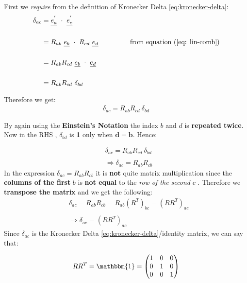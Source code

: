 First we {\em require} from the definition of Kronecker Delta \ref{eq:kronecker-delta}:
$$\begin{aligned}\delta_{ac} & = \underline{e_{a}^{'}} \ \cdot \ \underline{e_{c}^{'}}                                                                               \\ \\
                           & = R_{ab} \ \underline{e_{b}}\ \cdot \ R_{cd} \ \underline{e_{d}}\ \ \ \ \ \ \ \ \ \ \ \ \ \ \text{from equation (\ref{eq: lin-comb})} \\ \\
                           & = R_{ab}R_{cd}\ \underline{e_{b}}\ \cdot \ \underline{e_{d}}                                                                          \\ \\
                           & = R_{ab}R_{cd}\  \delta_{bd}
	\end{aligned}$$

Therefore we get:
$$\begin{aligned} \delta_{ac} = R_{ab}R_{cd}\ \delta_{bd} \end{aligned}$$

By again using the {\bf Einstein's Notation} the index $b$ and $d$ is {\bf repeated twice}. Now in the RHS , $\delta_{bd}$  is {\bf 1} only when $\boldsymbol{d=b}$. Hence:

$$\begin{aligned}      & \delta_{ac} = R_{ab}R_{cd}\ \delta_{bd} \\ \\ & \Rightarrow
                    \delta_{ac} = R_{ab}R_{cb}
	\end{aligned} $$
In the expression $\delta_{ac} = R_{ab}R_{cb}$ it is {\bf not} quite matrix multiplication since the {\bf columns of the first} $b$ is {\bf not equal} to the {\em row of the second} $c$ . Therefore we {\bf transpose the matrix} and we get the following:
$$\begin{aligned}     & \delta_{ac} = R_{ab}R_{cb} = R_{ab}(R^{T})_{bc} = (RR^{T})_{ac} \\ \\
                    & \Rightarrow \delta_{ac} = (RR^T)_{ac}\end{aligned}$$
Since $\delta_{ac}$ is the Kronecker Delta \ref{eq:kronecker-delta}/identity matrix, we can say that:

$$RR^{T} = \mathbbm{1} = \begin{pmatrix}1 & 0 & 0\\ 0 & 1 & 0 \\ 0 & 0 & 1 \end{pmatrix}$$

